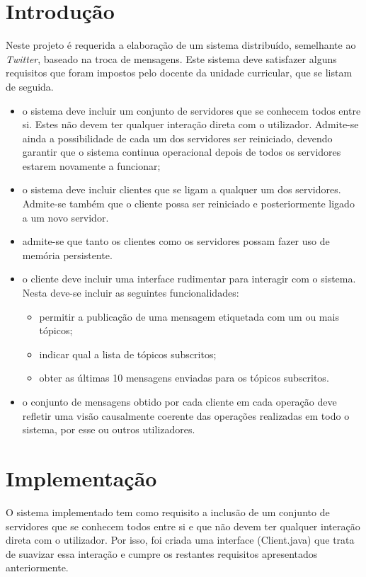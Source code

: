 \documentclass[a4paper]{report}
\begin{document}
\chapter{Introdução} \label{intro}
\large{
	Neste projeto é requerida a elaboração de um sistema distribuído, semelhante ao \textit{Twitter}, baseado na troca de mensagens. Este sistema deve satisfazer alguns requisitos que foram impostos pelo docente da unidade curricular, que se listam de seguida.
	\begin{itemize}
		\item o sistema deve incluir um conjunto de servidores que se conhecem todos entre si. Estes não devem ter qualquer interação direta com o utilizador. Admite-se ainda a possibilidade de cada um dos servidores ser reiniciado, devendo garantir que o sistema continua operacional depois de todos os servidores estarem novamente a funcionar;
		\item o sistema deve incluir clientes que se ligam a qualquer um dos servidores. Admite-se também que o cliente possa ser reiniciado e posteriormente ligado a um novo servidor.
		\item admite-se que tanto os clientes como os servidores possam fazer uso de memória persistente.
		\item o cliente deve incluir uma interface rudimentar para interagir com o sistema. Nesta deve-se incluir as seguintes funcionalidades:
		\begin{itemize}
			\item permitir a publicação de uma mensagem etiquetada com um ou mais tópicos;
			\item indicar qual a lista de tópicos subscritos;
			\item obter as últimas 10 mensagens enviadas para os tópicos subscritos.
		\end{itemize}
		\item o conjunto de mensagens obtido por cada cliente em cada operação deve refletir uma visão causalmente coerente das operações realizadas em todo o sistema, por esse ou outros utilizadores.
	\end{itemize}
}

\chapter{Implementação}
	O sistema implementado tem como requisito a inclusão de um conjunto de servidores que se conhecem todos entre si e que não devem ter qualquer interação direta com o utilizador.
	Por isso, foi criada uma interface (Client.java) que trata de suavizar essa interação e cumpre os restantes requisitos apresentados anteriormente.
\end{document}

